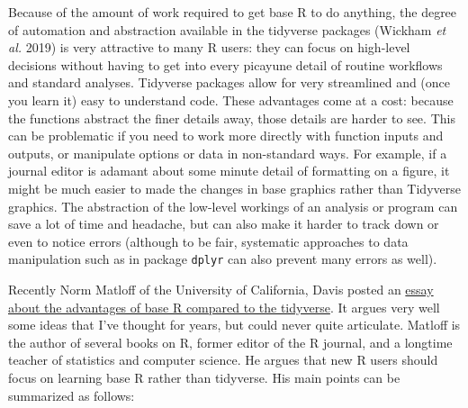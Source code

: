 \documentclass[
  13,
  letterpaper,
]{report}
\begin{document}
Because of the amount of work required to get base R to do anything, the
degree of automation and abstraction available in the tidyverse packages
(Wickham \emph{et al.} 2019) is very attractive to many R users: they
can focus on high-level decisions without having to get into every
picayune detail of routine workflows and standard analyses. Tidyverse
packages allow for very streamlined and (once you learn it) easy to
understand code. These advantages come at a cost: because the functions
abstract the finer details away, those details are harder to see. This
can be problematic if you need to work more directly with function
inputs and outputs, or manipulate options or data in non-standard ways.
For example, if a journal editor is adamant about some minute detail of
formatting on a figure, it might be much easier to made the changes in
base graphics rather than Tidyverse graphics. The abstraction of the
low-level workings of an analysis or program can save a lot of time and
headache, but can also make it harder to track down or even to notice
errors (although to be fair, systematic approaches to data manipulation
such as in package \texttt{dplyr} can also prevent many errors as well).

Recently Norm Matloff of the University of California, Davis posted an
\href{https://github.com/matloff/TidyverseSkeptic}{essay about the
advantages of base R compared to the tidyverse}. It argues very well
some ideas that I've thought for years, but could never quite
articulate. Matloff is the author of several books on R, former editor
of the R journal, and a longtime teacher of statistics and computer
science. He argues that new R users should focus on learning base R
rather than tidyverse. His main points can be summarized as follows:
\end{document}
